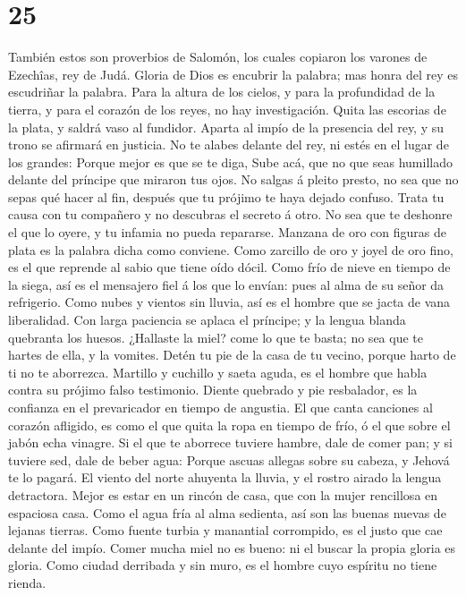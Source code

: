 \hypertarget{section-24}{%
\section{25}\label{section-24}}

 También estos son proverbios de Salomón, los cuales
copiaron los varones de Ezechîas, rey de Judá.  Gloria de
Dios es encubrir la palabra; mas honra del rey es escudriñar la palabra.
 Para la altura de los cielos, y para la profundidad de la
tierra, y para el corazón de los reyes, no hay investigación.
 Quita las escorias de la plata, y saldrá vaso al
fundidor.  Aparta al impío de la presencia del rey, y su
trono se afirmará en justicia.  No te alabes delante del
rey, ni estés en el lugar de los grandes:  Porque mejor es
que se te diga, Sube acá, que no que seas humillado delante del príncipe
que miraron tus ojos.  No salgas á pleito presto, no sea
que no sepas qué hacer al fin, después que tu prójimo te haya dejado
confuso.  Trata tu causa con tu compañero y no descubras
el secreto á otro.  No sea que te deshonre el que lo
oyere, y tu infamia no pueda repararse.  Manzana de oro
con figuras de plata es la palabra dicha como conviene. 
Como zarcillo de oro y joyel de oro fino, es el que reprende al sabio
que tiene oído dócil.  Como frío de nieve en tiempo de la
siega, así es el mensajero fiel á los que lo envían: pues al alma de su
señor da refrigerio.  Como nubes y vientos sin lluvia,
así es el hombre que se jacta de vana liberalidad.  Con
larga paciencia se aplaca el príncipe; y la lengua blanda quebranta los
huesos.  ¿Hallaste la miel? come lo que te basta; no sea
que te hartes de ella, y la vomites.  Detén tu pie de la
casa de tu vecino, porque harto de ti no te aborrezca. 
Martillo y cuchillo y saeta aguda, es el hombre que habla contra su
prójimo falso testimonio.  Diente quebrado y pie
resbalador, es la confianza en el prevaricador en tiempo de angustia.
 El que canta canciones al corazón afligido, es como el
que quita la ropa en tiempo de frío, ó el que sobre el jabón echa
vinagre.  Si el que te aborrece tuviere hambre, dale de
comer pan; y si tuviere sed, dale de beber agua:  Porque
ascuas allegas sobre su cabeza, y Jehová te lo pagará. 
El viento del norte ahuyenta la lluvia, y el rostro airado la lengua
detractora.  Mejor es estar en un rincón de casa, que con
la mujer rencillosa en espaciosa casa.  Como el agua fría
al alma sedienta, así son las buenas nuevas de lejanas tierras.
 Como fuente turbia y manantial corrompido, es el justo
que cae delante del impío.  Comer mucha miel no es bueno:
ni el buscar la propia gloria es gloria.  Como ciudad
derribada y sin muro, es el hombre cuyo espíritu no tiene rienda.

